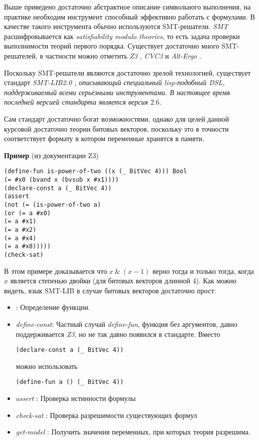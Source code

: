 Выше приведено достаточно абстрактное описание символьного выполнения, на практике необходим инструмент способный эффективно работать с формулами. В качестве такого инструмента обычно используются SMT-решатели.
{\em SMT} расшифровывается как {\em satisfiability modulo theories}, то есть задача проверки выполнимости теорий первого порядка. Существует достаточно много SMT-решателей,
в частности можно отметить {\em Z3} \cite{Z3}, {\em CVC3} \cite{CVC3} и {\em Alt-Ergo} \cite{Alt-Ergo}.

\bigskip

Поскольку SMT-решатели являются достаточно зрелой технологией, существует стандарт \em {SMT-LIB2.0} \cite{smtlib}, описывающий специальный lisp-подобный DSL, поддерживаемый всеми серьезными инструментами. В настоящее время последней версией стандарта является версия $2.6$.

Сам стандарт достаточно богат возможностями, однако для целей данной курсовой достаточно теории
битовых векторов, поскольку это в точности соответствует формату в котором переменные хранятся в памяти.

{\bf Пример} (из документации Z3)
\begin{lstlisting}
(define-fun is-power-of-two ((x (_ BitVec 4))) Bool
(= #x0 (bvand x (bvsub x #x1))))
(declare-const a (_ BitVec 4))
(assert
(not (= (is-power-of-two a)
(or (= a #x0)
(= a #x1)
(= a #x2)
(= a #x4)
(= a #x8)))))
(check-sat)
\end{lstlisting}

В этом примере доказывается что $x \:\&\: (x - 1)$ верно тогда и только тогда, когда $x$ является степенью двойки (для битовых векторов длинной 4). Как можно видеть, язык SMT-LIB в случае битовых векторов достаточно прост:

\begin{itemize}
\item {}: Определение функции.

\item {\em define-const}: Частный случай {\em define-fun}, функция без аргументов, давно поддерживается {\em Z3}, но не так давно появился в стандарте. Вместо
\begin{verbatim}(declare-const a (_ BitVec 4))\end{verbatim}
можно использовать
\begin{verbatim}(define-fun a () (_ BitVec 4))\end{verbatim}

\item {\em assert }: Проверка истинности формулы

\item {\em check-sat }: Проверка разрешимости существующих формул

\item {\em get-model }: Получить значения переменных, при которых теория разрешима.

\end{itemize}

